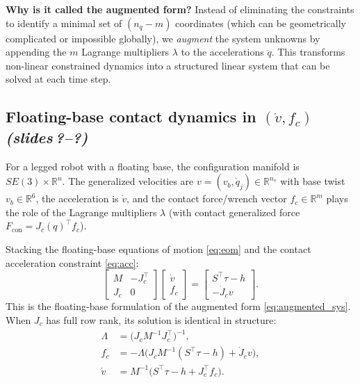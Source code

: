 \documentclass[11pt,a4paper]{article}
\newcommand{\R}{\mathbb{R}}
\newcommand{\sr}{\emph{(slides\,?--?)}}
\newcommand{\Jc}{J_c}
\begin{document}
\begin{intuition}
\textbf{Why is it called the augmented form?}
Instead of eliminating the constraints to identify a minimal set of $(n_q - m)$ coordinates (which can be geometrically complicated or impossible globally), we \emph{augment} the system unknowns by appending the $m$ Lagrange multipliers $\lambda$ to the accelerations $\ddot q$. This transforms non-linear constrained dynamics into a structured linear system that can be solved at each time step.
\end{intuition}

\subsection{Floating-base contact dynamics in $(\dot v, f_c)$ \sr}

For a legged robot with a floating base, the configuration manifold is $SE(3) \times \R^n$. The generalized velocities are $v = (v_b, \dot q_j) \in \R^{n_v}$ with base twist $v_b \in \R^6$, the acceleration is $\dot v$, and the contact force/wrench vector $f_c \in \R^m$ plays the role of the Lagrange multipliers $\lambda$ (with contact generalized force $F_{\mathrm{con}} = \Jc(q)^\top f_c$).

Stacking the floating-base equations of motion \eqref{eq:eom} and the contact acceleration constraint \eqref{eq:acc}:
\begin{equation}\label{eq:kkt}
\begin{bmatrix} M & -\Jc^{\top}\\ \Jc & 0\end{bmatrix}
\begin{bmatrix}\dot v\\ f_c\end{bmatrix}
=
\begin{bmatrix} S^{\top}\tau-h\\ -\dot J_c v\end{bmatrix}.
\end{equation}
This is the floating-base formulation of the augmented form \eqref{eq:augmented_sys}. When $\Jc$ has full row rank, its solution is identical in structure:
\begin{align}
  \Lambda &= \big(\Jc M^{-1}\Jc^\top\big)^{-1}, \label{eq:lambda}\\
  f_c &= -\Lambda\Big(\Jc M^{-1}(S^\top\tau-h)+\dot J_c v\Big), \label{eq:fc}\\
  \dot v &= M^{-1}\big(S^\top\tau-h+\Jc^\top f_c\big). \label{eq:vdot}
\end{align}
\end{document}
